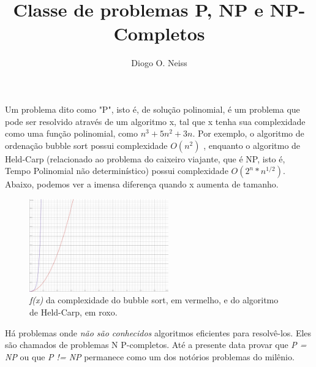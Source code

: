 \documentclass[14pt]{article}
\begin{document}
 



\title{Classe de problemas P, NP e NP-Completos}

\author{Diogo O. Neiss}
  

\address{Graduandos em Ciência da Computação \\
Pontifícia Universidade Católica de Minas Gerais
(PUC MG)\\
Av. Dom José Gaspar, 500 Coração Eucarístico - Belo Horizonte - MG 30535-901, Brasil\\
}

\maketitle
     

  Um problema dito como "P", isto é, de solução polinomial, é um problema que pode ser resolvido através de um algoritmo x, tal que x tenha sua complexidade como uma função         polinomial, como $n^{3} + 5n^{2}+3n$. Por exemplo, o algoritmo de ordenação bubble sort possui complexidade $O(n^2)$ , enquanto o algoritmo de Held-Carp (relacionado ao problema do caixeiro viajante, que é NP, isto é, Tempo Polinomial não determinístico) possui complexidade $O({2^{n}} * n^{1/2})$. Abaixo, podemos ver a imensa diferença quando x aumenta de tamanho. 
  \begin{figure}[h]
      \centering
      \includegraphics[width=6cm]{desmos-graph.png}
      \caption{\textit{f(x)} da complexidade do bubble sort, em vermelho, e do algoritmo de Held-Carp, em roxo.}
      \label{fig:grafico}
  \end{figure}
  
Há problemas onde \textit{não são conhecidos} algoritmos eficientes
para resolvê-los. Eles são chamados de problemas N P-completos. Até a presente data provar que \textit{P = NP} ou que \textit{P != NP} permanece como um dos notórios problemas do milênio.
\end{document}

